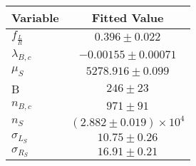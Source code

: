 \begin{tabular}[t]{lc}
\hline
Variable &Fitted Value\\
\hline\hline
$f_{\frac{L}{R}}$&$0.396\pm0.022$\\
\hline
$\lambda_{B,c}$&$-0.00155\pm0.00071$\\
\hline
$\mu_S$&$5278.916\pm0.099$\\
\hline
B&$246\pm23$\\
\hline
$n_{B,c}$&$971\pm91$\\
\hline
$n_S$&$(2.882\pm0.019)\times 10^4$\\
\hline
$\sigma_{L_S}$&$10.75\pm0.26$\\
\hline
$\sigma_{R_S}$&$16.91\pm0.21$\\
\hline
\end{tabular}